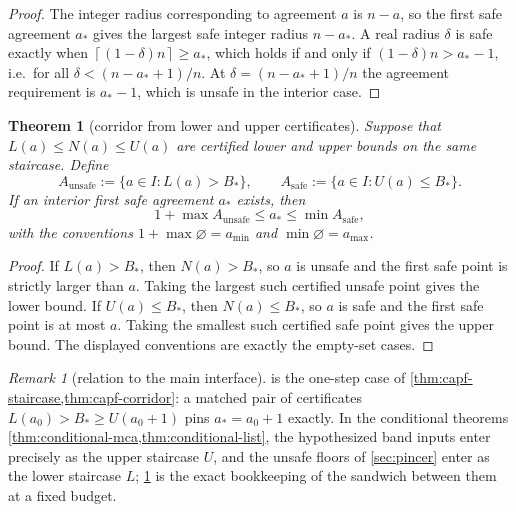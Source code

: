 \documentclass[11pt]{article}
\newtheorem{theorem}{Theorem}[section]
\theoremstyle{definition}
\theoremstyle{remark}
\newtheorem{remark}[remark]{Remark}
\providecommand{\ceil}[1]{\left\lceil #1\right\rceil}
\begin{document}
\begin{proof}
The integer radius corresponding to agreement $a$ is $n-a$, so the first safe agreement $a_*$ gives the largest safe integer radius $n-a_*$.  A real radius $\delta$ is safe exactly when $\ceil{(1-\delta)n}\ge a_*$, which holds if and only if $(1-\delta)n>a_*-1$, i.e.\ for all $\delta<(n-a_*+1)/n$.  At $\delta=(n-a_*+1)/n$ the agreement requirement is $a_*-1$, which is unsafe in the interior case.
\end{proof}

\begin{theorem}[corridor from lower and upper certificates]\label{thm:capf-corridor}
Suppose that $L(a)\le N(a)\le U(a)$ are certified lower and upper bounds on the same staircase.  Define
\[
        A_{\mathrm{unsafe}}:=\{a\in I:L(a)>B_*\},
        \qquad
        A_{\mathrm{safe}}:=\{a\in I:U(a)\le B_*\}.
\]
If an interior first safe agreement $a_*$ exists, then
\[
        1+\max A_{\mathrm{unsafe}}\le a_*\le \min A_{\mathrm{safe}},
\]
with the conventions $1+\max\varnothing=a_{\min}$ and $\min\varnothing=a_{\max}$.
\end{theorem}

\begin{proof}
If $L(a)>B_*$, then $N(a)>B_*$, so $a$ is unsafe and the first safe point is strictly larger than $a$.  Taking the largest such certified unsafe point gives the lower bound.  If $U(a)\le B_*$, then $N(a)\le B_*$, so $a$ is safe and the first safe point is at most $a$.  Taking the smallest such certified safe point gives the upper bound.  The displayed conventions are exactly the empty-set cases.
\end{proof}

\begin{remark}[relation to the main interface]\label{rem:capf-staircase-main}
 is the one-step case of \cref{thm:capf-staircase,thm:capf-corridor}: a matched pair of certificates $L(a_0)>B_*\ge U(a_0+1)$ pins $a_*=a_0+1$ exactly.  In the conditional theorems \cref{thm:conditional-mca,thm:conditional-list}, the hypothesized band inputs enter precisely as the upper staircase $U$, and the unsafe floors of \cref{sec:pincer} enter as the lower staircase $L$; \cref{thm:capf-corridor} is the exact bookkeeping of the sandwich between them at a fixed budget.
\end{remark}
\end{document}
